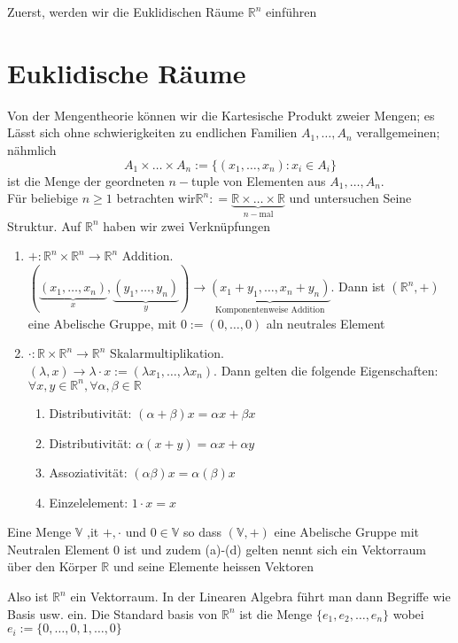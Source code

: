 \noindent Zuerst, werden wir die Euklidischen Räume $\mathbb{R}^n$ einführen
\section{Euklidische Räume}
Von der Mengentheorie können wir die Kartesische Produkt zweier Mengen; es Lässt sich ohne schwierigkeiten zu endlichen Familien $A_1,\dots ,A_n$ verallgemeinen; nähmlich \[A_1\times\dots\times A_n:=\{\left(x_1,\dots ,x_n\right):x_i\in A_i \}\] ist die Menge der geordneten $n-$tuple von Elementen aus $A_1,\dots ,A_n$.\\

Für beliebige $n\geq 1$ betrachten wir$ \mathbb{R}^n: = \underbrace {\mathbb{R} \times  \ldots  \times \mathbb{R} }_{n - {\text{mal}}}$ und untersuchen Seine Struktur. Auf $\mathbb{R}^n$ haben wir zwei Verknüpfungen
\begin{enumerate}
    \item $+:\mathbb{R}^n\times\mathbb{R}^n\rightarrow\mathbb{R}^n$ Addition.\\
$\left( {\underbrace {\left( {{x_1}, \ldots ,{x_n}} \right)}_x,\underbrace {\left( {{y_1}, \ldots ,{y_n}} \right)}_y} \right) \to \underbrace {\left( {{x_1} + {y_1}, \ldots ,{x_n} + {y_n}} \right)}_{{\text{Komponentenweise Addition}}}$. Dann ist $\left( \mathbb{R}^n,+\right)$ eine Abelische Gruppe, mit $0:=(0,\dots,0)$ aln neutrales Element
\item $\cdot:\mathbb{R}\times\mathbb{R}^n\rightarrow\mathbb{R}^n$ Skalarmultiplikation.\\
$(\lambda,x)\rightarrow\lambda\cdot x:=(\lambda x_1,\dots,\lambda x_n)$. Dann gelten die folgende Eigenschaften: $\forall x,y\in\mathbb{R}^n,\forall \alpha,\beta\in\mathbb{R}$ 
\begin{enumerate}
\item Distributivität: $\left( \alpha+\beta\right) x=\alpha x+\beta x$
\item Distributivität: $\alpha\left(x+y\right) = \alpha x+\alpha y$
\item Assoziativität: $\left( \alpha\beta\right) x=\alpha\left( \beta\right) x$
\item Einzelelement: $1\cdot x=x$
\end{enumerate}
\end{enumerate}
 
\begin{definition}{2.15}
Eine Menge $\mathbb{V}$ ,it $+,\cdot$ und $0\in\mathbb{V}$ so dass $\left(\mathbb{V},+\right)$ eine Abelische Gruppe mit Neutralen Element 0 ist und zudem (a)-(d) gelten nennt sich ein Vektorraum über den Körper $\mathbb{R}$ und seine Elemente heissen Vektoren
\end{definition}
Also ist $\mathbb{R}^n$ ein Vektorraum. In der Linearen Algebra führt man dann Begriffe wie Basis usw. ein. Die Standard basis von $\mathbb{R}^n$ ist die Menge $\{e_1,e_2,\dots,e_n \}$ wobei $e_i:=\{0,\dots,0,1,\dots,0\}$ \\

